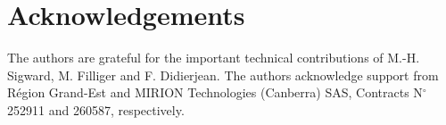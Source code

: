 \section{Acknowledgements}
\label{sec:acknowledgements}
The authors are grateful for the important technical contributions of M.-H. Sigward, M. Filliger and F. Didierjean. The authors acknowledge support from Région Grand-Est and MIRION Technologies (Canberra) SAS, Contracts N$^\circ$\,252911 and 260587, respectively.

\FloatBarrier
%





